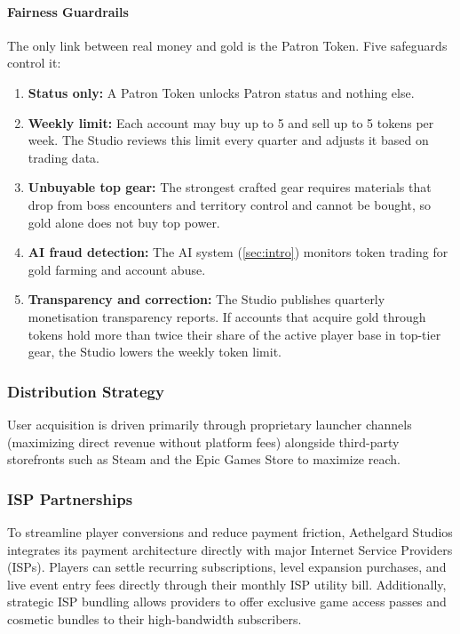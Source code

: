 \paragraph{Fairness Guardrails}
The only link between real money and gold is the Patron Token. Five safeguards control it:
\begin{enumerate}
  \item \textbf{Status only:} A Patron Token unlocks Patron status and nothing else.
  \item \textbf{Weekly limit:} Each account may buy up to 5 and sell up to 5 tokens per week. The Studio reviews this limit every
  quarter and adjusts it based on trading data.
  \item \textbf{Unbuyable top gear:} The strongest crafted gear requires materials that drop from boss encounters and territory
  control and cannot be bought, so gold alone does not buy top power.
  \item \textbf{AI fraud detection:} The AI system (\autoref{sec:intro}) monitors token trading for gold farming and account
  abuse.
  \item \textbf{Transparency and correction:} The Studio publishes quarterly monetisation transparency reports. If accounts that
  acquire gold through tokens hold more than twice their share of the active player base in top-tier gear, the Studio lowers the
  weekly token limit.
\end{enumerate}

\subsubsection{Distribution Strategy}
User acquisition is driven primarily through proprietary launcher channels (maximizing direct revenue without platform fees)
alongside third-party storefronts such as Steam and the Epic Games Store to maximize reach.

\subsubsection{ISP Partnerships}
To streamline player conversions and reduce payment friction, Aethelgard Studios integrates its payment architecture directly with
major Internet Service Providers (ISPs).
Players can settle recurring subscriptions, level expansion purchases, and live event entry fees directly through their monthly
ISP utility bill.
Additionally, strategic ISP bundling allows providers to offer exclusive game access passes and cosmetic bundles to their
high-bandwidth subscribers.

